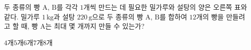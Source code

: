\noindent\begin{minipage}[t]{0.58\linewidth}\vspace{0pt}\raggedright 두 종류의 빵 $\mathrm{A}$, $\mathrm{B}$를 각각 $1$개씩 만드는 데 필요한 밀가루와 설탕의 양은 오른쪽 표와 같다. 밀가루 $1\,\mathrm{kg}$과 설탕 $220\,\mathrm{g}$으로 두 종류의 빵 $\mathrm{A}$, $\mathrm{B}$를 합하여 $12$개의 빵을 만들려고 할 때, 빵 $\mathrm{A}$는 최대 몇 개까지 만들 수 있는가?\end{minipage}\hfill\begin{minipage}[t]{0.4\linewidth}\vspace{0pt}\centering \resizebox{\ifdim\width>\linewidth\linewidth\else\width\fi}{!}{}\end{minipage}\par
\begin{choices32}{$4$개}{$5$개}{$6$개}{$7$개}{$8$개}\end{choices32}
